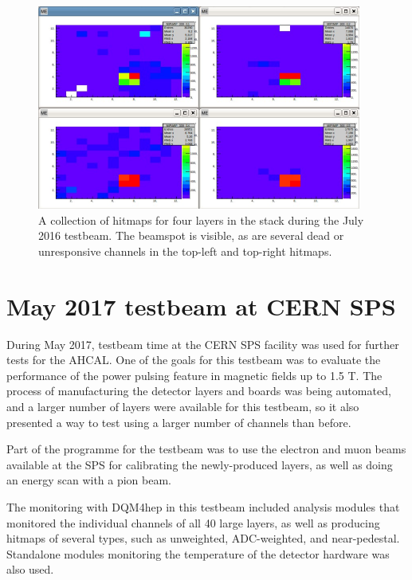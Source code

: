 \begin{figure}[p]
	\centering
	\includegraphics[width=0.95\textwidth]{../Pictures/AHCALHitmapFour.png}
	\caption{A collection of hitmaps for four layers in the stack during the July 2016 testbeam. The beamspot is visible, as are several dead or unresponsive channels in the top-left and top-right hitmaps.}
	\label{figure:aida/july2016/four-hitmap}
\end{figure}


\section{May 2017 testbeam at CERN SPS} %
During May 2017, testbeam time at the \acrshort{CERN} \acrfull{SPS} facility was used for further tests for the \acrshort{AHCAL}. One of the goals for this testbeam was to evaluate the performance of the power pulsing feature in magnetic fields up to 1.5 T. The process of manufacturing the detector layers and boards was being automated, and a larger number of layers were available for this testbeam, so it also presented a way to test using a larger number of channels than before. 

Part of the programme for the testbeam was to use the electron and muon beams available at the \acrshort{SPS} for calibrating the newly-produced layers, as well as doing an energy scan with a pion beam.

The monitoring with \acrshort{DQM4hep} in this testbeam included analysis modules that monitored the individual channels of all 40 large layers, as well as producing hitmaps of several types, such as unweighted, \acrshort{ADC}-weighted, and near-pedestal. Standalone modules monitoring the temperature of the detector hardware was also used. 

